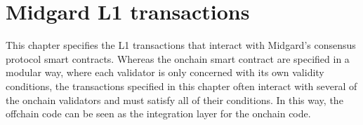 \documentclass[../midgard.tex]{subfiles}
\begin{document}
\chapter{Midgard L1 transactions}
\label{h:midgard-l1-transactions}

This chapter specifies the L1 transactions that interact with Midgard's consensus protocol smart contracts.
Whereas the onchain smart contract are specified in a modular way, where each validator is only concerned with its own validity conditions, the transactions specified in this chapter often interact with several of the onchain validators and must satisfy all of their conditions.
In this way, the offchain code can be seen as the integration layer for the onchain code.
\todo
\end{document}
